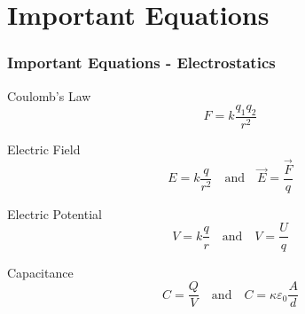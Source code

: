 \documentclass{beamer}
\begin{document}
\section{Important Equations}

\begin{frame}
    \frametitle{Important Equations - Electrostatics}
    \begin{block}{Coulomb's Law}
        \begin{equation}
            F = k\frac{q_1 q_2}{r^2}
        \end{equation}
    \end{block}
    
    \begin{block}{Electric Field}
        \begin{equation}
            E = k\frac{q}{r^2} \quad \text{and} \quad \vec{E} = \frac{\vec{F}}{q}
        \end{equation}
    \end{block}
    
    \begin{block}{Electric Potential}
        \begin{equation}
            V = k\frac{q}{r} \quad \text{and} \quad V = \frac{U}{q}
        \end{equation}
    \end{block}
    
    \begin{block}{Capacitance}
        \begin{equation}
            C = \frac{Q}{V} \quad \text{and} \quad C = \kappa\varepsilon_0\frac{A}{d}
        \end{equation}
    \end{block}
\end{frame}
\end{document}
